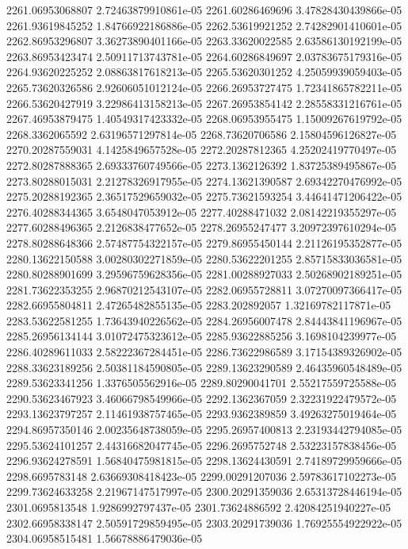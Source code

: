 {2261.06953068807 2.72463879910861e-05
2261.60286469696 3.47828430439866e-05
2261.93619845252 1.84766922186886e-05
2262.53619921252 2.74282901410601e-05
2262.86953296807 3.36273890401166e-05
2263.33620022585 2.63586130192199e-05
2263.86953423474 2.50911713743781e-05
2264.60286849697 2.03783675179316e-05
2264.93620225252 2.08863817618213e-05
2265.53620301252 4.25059939059403e-05
2265.73620326586 2.92606051012124e-05
2266.26953727475 1.72341865782211e-05
2266.53620427919 3.22986413158213e-05
2267.26953854142 2.28558331216761e-05
2267.46953879475 1.40549317423332e-05
2268.06953955475 1.15009267619792e-05
2268.3362065592 2.63196571297814e-05
2268.73620706586 2.15804596126827e-05
2270.20287559031 4.1425849657528e-05
2272.20287812365 4.25202419770497e-05
2272.80287888365 2.69333760749566e-05
2273.1362126392 1.83725389495867e-05
2273.80288015031 2.21278326917955e-05
2274.13621390587 2.69342270476992e-05
2275.20288192365 2.36517529659032e-05
2275.73621593254 3.44641471206422e-05
2276.40288344365 3.6548047053912e-05
2277.40288471032 2.08142219355297e-05
2277.60288496365 2.2126838477652e-05
2278.26955247477 3.20972397610294e-05
2278.80288648366 2.57487754322157e-05
2279.86955450144 2.21126195352877e-05
2280.13622150588 3.00280302271859e-05
2280.53622201255 2.85715833036581e-05
2280.80288901699 3.29596759628356e-05
2281.00288927033 2.50268902189251e-05
2281.73622353255 2.96870212543107e-05
2282.06955728811 3.07270097366417e-05
2282.66955804811 2.47265482855135e-05
2283.202892057 1.32169782117871e-05
2283.53622581255 1.73643940226562e-05
2284.26956007478 2.84443841196967e-05
2285.26956134144 3.01072475323612e-05
2285.93622885256 3.1698104239977e-05
2286.40289611033 2.58222367284451e-05
2286.73622986589 3.17154389326902e-05
2288.33623189256 2.50381184590805e-05
2289.13623290589 2.46435960548489e-05
2289.53623341256 1.3376505562916e-05
2289.80290041701 2.55217559725588e-05
2290.53623467923 3.46066798549966e-05
2292.1362367059 2.32231922479572e-05
2293.13623797257 2.11461938757465e-05
2293.9362389859 3.49263275019464e-05
2294.86957350146 2.00235648738059e-05
2295.26957400813 2.23193442794085e-05
2295.53624101257 2.44316682047745e-05
2296.2695752748 2.53223157838456e-05
2296.93624278591 1.56840475981815e-05
2298.13624430591 2.74189729959666e-05
2298.6695783148 2.63669308418423e-05
2299.00291207036 2.59783617102273e-05
2299.73624633258 2.21967147517997e-05
2300.20291359036 2.65313728446194e-05
2301.0695813548 1.9286992797437e-05
2301.73624886592 2.42084251940227e-05
2302.66958338147 2.50591729859495e-05
2303.20291739036 1.76925554922922e-05
2304.06958515481 1.56678886479036e-05
}
